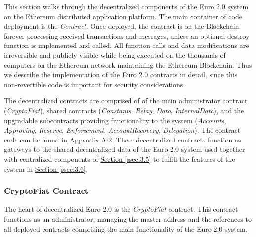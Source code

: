 \documentclass[a4paper,12pt]{article} %
\newcommand{\hypersectionref}[1]{\hyperref[#1]{Section \ref{#1}}}
\begin{document}
{{This section walks through the decentralized components of the Euro 2.0 system on the Ethereum distributed application platform. The main container of code deployment is the \textit{Contract}. Once deployed, the contract is on the Blockchain forever processing received transactions and messages, unless an optional destroy function is implemented and called. All function calls and data modifications are irreversible and publicly visible while being executed on the thousands of computers on the Ethereum network maintaining the Ethereum Blockchain. Thus we describe the implementation of the Euro 2.0 contracts in detail, since this non-revertible code is important for security considerations.

The decentralized contracts are comprised of of the main administrator contract (\textit{CryptoFiat}), shared contracts (\textit{Constants}, \textit{Relay}, \textit{Data}, \textit{InternalData}), and the upgradable subcontracts providing functionality to the system (\textit{Accounts}, \textit{Approving}, \textit{Reserve}, \textit{Enforcement}, \textit{AccountRecovery}, \textit{Delegation}). The contract code can be found in \hyperref[ssec:a.2]{Appendix A:2}. These decentralized contracts function as gateways to the shared decentralized data of the Euro 2.0 system used together with centralized components of \hypersectionref{ssec:3.5} to fulfill the features of the system in \hypersectionref{ssec:3.6}.


\subsubsection{CryptoFiat Contract} \label{sssec:3.4:cryptofiat}

The heart of decentralized Euro 2.0 is the \textit{CryptoFiat} contract. This contract functions as an administrator, managing the master address and the references to all deployed contracts comprising the main functionality of the Euro 2.0 system.

}}
\end{document}
